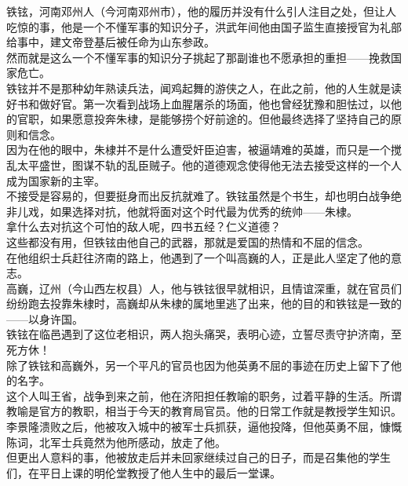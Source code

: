 \begin{multicols}{\theparacolNo}
铁铉，河南邓州人（今河南邓州市），他的履历并没有什么引人注目之处，但让人吃惊的事，他是一个不懂军事的知识分子，洪武年间他由国子监生直接授官为礼部给事中，建文帝登基后被任命为山东参政。\\

然而就是这么一个不懂军事的知识分子挑起了那副谁也不愿承担的重担——挽救国家危亡。\\

铁铉并不是那种幼年熟读兵法，闻鸡起舞的游侠之人，在此之前，他的人生就是读好书和做好官。第一次看到战场上血腥屠杀的场面，他也曾经犹豫和胆怯过，以他的官职，如果愿意投奔朱棣，是能够捞个好前途的。但他最终选择了坚持自己的原则和信念。\\

因为在他的眼中，朱棣并不是什么遭受奸臣迫害，被逼靖难的英雄，而只是一个搅乱太平盛世，图谋不轨的乱臣贼子。他的道德观念使得他无法去接受这样的一个人成为国家新的主宰。\\

不接受是容易的，但要挺身而出反抗就难了。铁铉虽然是个书生，却也明白战争绝非儿戏，如果选择对抗，他就将面对这个时代最为优秀的统帅——朱棣。\\

拿什么去对抗这个可怕的敌人呢，四书五经？仁义道德？\\

这些都没有用，但铁铉由他自己的武器，那就是爱国的热情和不屈的信念。\\

在他组织士兵赶往济南的路上，他遇到了一个叫高巍的人，正是此人坚定了他的意志。\\

高巍，辽州（今山西左权县）人，他与铁铉很早就相识，且情谊深重，就在官员们纷纷跑去投靠朱棣时，高巍却从朱棣的属地里逃了出来，他的目的和铁铉是一致的——以身许国。\\

铁铉在临邑遇到了这位老相识，两人抱头痛哭，表明心迹，立誓尽责守护济南，至死方休！\\

除了铁铉和高巍外，另一个平凡的官员也因为他英勇不屈的事迹在历史上留下了他的名字。\\

这个人叫王省，战争到来之前，他在济阳担任教喻的职务，过着平静的生活。所谓教喻是官方的教职，相当于今天的教育局官员。他的日常工作就是教授学生知识。李景隆溃败之后，他被攻入城中的被军士兵抓获，逼他投降，但他英勇不屈，慷慨陈词，北军士兵竟然为他所感动，放走了他。\\

但更出人意料的事，他被放走后并未回家继续过自己的日子，而是召集他的学生们，在平日上课的明伦堂教授了他人生中的最后一堂课。\\


\end{multicols}
